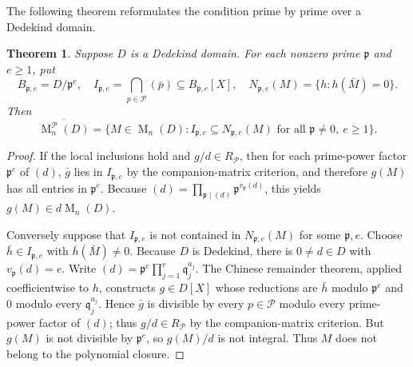 \documentclass[11pt]{amsart}
\newtheorem{theorem}{Theorem}[section]
\theoremstyle{definition}
\theoremstyle{remark}
\newcommand{\Mat}{\operatorname{M}}
\begin{document}
The following theorem reformulates the condition prime by prime over a Dedekind domain.
\begin{theorem}\label{thm:local}
Suppose $D$ is a Dedekind domain. For each nonzero prime $\mathfrak p$ and
$e\ge1$, put
\[
B_{\mathfrak p,e}=D/\mathfrak p^e,\quad
I_{\mathfrak p,e}=\bigcap_{p\in\mathcal P}(\bar p)
  \subseteq B_{\mathfrak p,e}[X],\quad
N_{\mathfrak p,e}(M)=\{h:h(\bar M)=0\}.
\]
Then
\begin{equation}\label{eq:local}
\overline{\Mat_n^{\mathcal P}(D)}
 =\{M\in\Mat_n(D):I_{\mathfrak p,e}\subseteq N_{\mathfrak p,e}(M)
 \text{ for all }\mathfrak p\ne0,\ e\ge1\}.
\end{equation}
\end{theorem}
\begin{proof}
If the local inclusions hold and $g/d\in R_{\mathcal P}$,
then for each prime-power factor $\mathfrak p^{e}$ of $(d)$,
$\bar g$ lies in $I_{\mathfrak p,e}$ by the companion-matrix criterion, and therefore
$g(M)$ has all entries in $\mathfrak p^e$. Because
$(d)=\prod_{\mathfrak p\mid(d)}\mathfrak p^{v_{\mathfrak p}(d)}$,
this yields $g(M)\in d\Mat_n(D)$.

Conversely suppose that $I_{\mathfrak p,e}$ is not contained in
$N_{\mathfrak p,e}(M)$ for some $\mathfrak p,e$.
Choose $\bar h\in I_{\mathfrak p,e}$ with $\bar h(\bar M)\ne0$.
Because $D$ is Dedekind, there is $0\ne d\in D$ with
$v_{\mathfrak p}(d)=e$. Write $(d)=\mathfrak p^e\prod_{j=1}^r\mathfrak q_j^{a_j}$.
The Chinese remainder theorem, applied coefficientwise to $h$, constructs
$g\in D[X]$ whose reductions are $\bar h$ modulo $\mathfrak p^e$ and $0$
modulo every $\mathfrak q_j^{a_j}$. Hence $\bar g$ is divisible
by every $p\in\mathcal P$ modulo every prime-power factor of $(d)$;
thus $g/d\in R_{\mathcal P}$ by the companion-matrix criterion. But
$g(M)$ is not divisible by $\mathfrak p^e$, so $g(M)/d$ is not integral.
Thus $M$ does not belong to the polynomial closure.
\end{proof}
\end{document}
